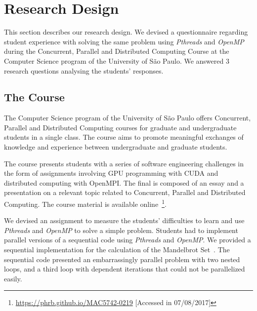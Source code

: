 \section{Research Design}
\label{sec:researchdesign}

This section describes our research design. We devised a questionnaire
regarding student experience with solving the same problem using
\textit{Pthreads} and \textit{OpenMP} during the Concurrent, Parallel and
Distributed Computing Course at the Computer Science program of the University
of São Paulo. We answered 3 research questions analysing the students'
responses.

\subsection{The Course}

The Computer Science program of the University of São Paulo offers Concurrent,
Parallel and Distributed Computing courses for graduate and undergraduate
students in a single class. The course aims to promote meaningful exchanges of
knowledge and experience between undergraduate and graduate students.

The course presents students with a series of software engineering challenges
in the form of assignments involving GPU programming with CUDA and distributed
computing with OpenMPI. The final is composed of an essay and a presentation on
a relevant topic related to Concurrent, Parallel and Distributed Computing.
The course material is available
online~\footnote{\url{https://phrb.github.io/MAC5742-0219} [Accessed in
07/08/2017]}.

We devised an assignment to measure the students' difficulties to learn and use
\textit{Pthreads} and \textit{OpenMP} to solve a simple problem. Students had
to implement parallel versions of a sequential code using \textit{Pthreads} and
\textit{OpenMP}.  We provided a sequential implementation for the calculation
of the Mandelbrot Set~\cite{douady1984etude}. The sequential code presented an
embarrassingly parallel problem with two nested loops, and a third loop with
dependent iterations that could not be parallelized easily.

